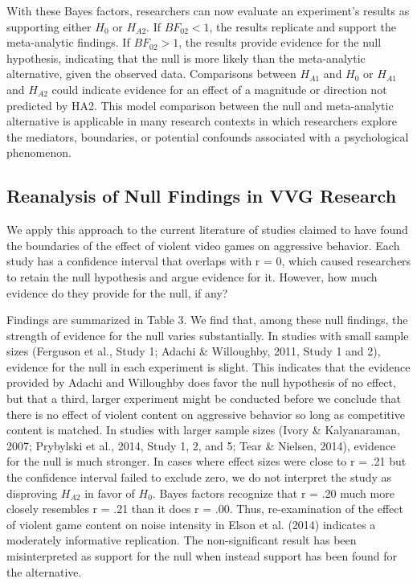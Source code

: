 \documentclass[fignum,nobf,man]{apa}
\begin{document}
With these Bayes factors, researchers can now evaluate an experiment’s results as supporting either $H_0$ or $H_{A2}$. If $BF_{02} < 1$, the results replicate and support the meta-analytic findings. If $BF_{02} > 1$, the results provide evidence for the null hypothesis, indicating that the null is more likely than the meta-analytic alternative, given the observed data.  Comparisons between $H_{A1}$ and $H_0$ or $H_{A1}$ and $H_{A2}$ could indicate evidence for an effect of a magnitude or direction not predicted by HA2. This model comparison between the null and meta-analytic alternative is applicable in many research contexts in which researchers explore the mediators, boundaries, or potential confounds associated with a psychological phenomenon.

\subsection{Reanalysis of Null Findings in VVG Research}
We apply this approach to the current literature of studies claimed to have found the boundaries of the effect of violent video games on aggressive behavior. Each study has a confidence interval that overlaps with r = 0, which caused researchers to retain the null hypothesis and argue evidence for it. However, how much evidence do they provide for the null, if any?

Findings are summarized in Table 3. We find that, among these null findings, the strength of evidence for the null varies substantially. In studies with small sample sizes (Ferguson et al., Study 1; Adachi \& Willoughby, 2011, Study 1 and 2), evidence for the null in each experiment is slight. This indicates that the evidence provided by Adachi and Willoughby does favor the null hypothesis of no effect, but that a third, larger experiment might be conducted before we conclude that there is no effect of violent content on aggressive behavior so long as competitive content is matched. In studies with larger sample sizes (Ivory \& Kalyanaraman, 2007; Prybylski et al., 2014, Study 1, 2, and 5; Tear \& Nielsen, 2014), evidence for the null is much stronger.	In cases where effect sizes were close to r = .21 but the confidence interval failed to exclude zero, we do not interpret the study as disproving $H_{A2}$ in favor of $H_0$. Bayes factors recognize that r = .20 much more closely resembles r = .21 than it does r = .00. Thus, re-examination of the effect of violent game content on noise intensity in Elson et al. (2014) indicates a moderately informative replication. The non-significant result has been misinterpreted as support for the null when instead support has been found for the alternative.
\end{document}
